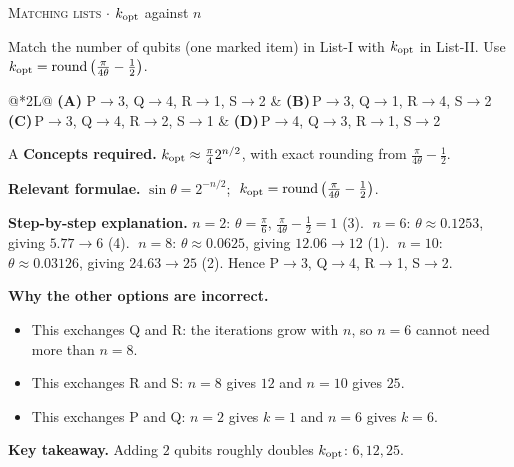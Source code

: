 \documentclass[11pt,a4paper]{article}
\newcommand{\optlabel}[1]{\textbf{(#1)}}
\newcommand{\correctlabel}[1]{\textcolor{okgreen}{\textbf{(#1)}\,\ding{51}}}
\newenvironment{qitem}[1]{\begin{list}{}{\setlength{\leftmargin}{3.3em}\setlength{\labelwidth}{3.1em}%
  \setlength{\labelsep}{0.2em}\setlength{\topsep}{3pt}\setlength{\parsep}{3pt}}\item[\textbf{Q.#1}\hfill]}{\end{list}}
\newcommand{\qsep}{\par\vspace{2pt}{\color{black!15}\hrule}\vspace{4pt}}
\newcommand{\qmeta}[2]{{\footnotesize\color{black!60}\textsc{#1} \;$\cdot$\; #2}\par}
\begin{document}
\begin{qitem}{55}
\qmeta{Matching lists}{$k_{\rm opt}$ against $n$}
Match the number of qubits (one marked item) in List-I with $k_{\rm opt}$ in List-II. Use $k_{\rm opt} = \operatorname{round}\big(\frac{\pi}{4\theta} - \frac12\big)$.
\par\smallskip{}
\par\smallskip\noindent\begin{tabularx}{\linewidth}{@{}*{2}{L}@{}}
\correctlabel{A}\,P$\to$3, Q$\to$4, R$\to$1, S$\to$2 & \optlabel{B}\,P$\to$3, Q$\to$1, R$\to$4, S$\to$2 \\[3pt]
\optlabel{C}\,P$\to$3, Q$\to$4, R$\to$2, S$\to$1 & \optlabel{D}\,P$\to$4, Q$\to$3, R$\to$1, S$\to$2
\end{tabularx}
\end{qitem}
\begin{solbox}{A}
\textbf{\color{brand}Concepts required.} $k_{\rm opt} \approx \frac\pi4 2^{n/2}$, with exact rounding from $\frac{\pi}{4\theta} - \frac12$.

\textbf{\color{brand}Relevant formulae.} $\sin\theta = 2^{-n/2}$; $\;k_{\rm opt} = \operatorname{round}\big(\frac{\pi}{4\theta} - \frac12\big)$.

\textbf{\color{brand}Step-by-step explanation.} $n = 2$: $\theta = \frac\pi6$, $\frac{\pi}{4\theta} - \frac12 = 1$ (3). $\;n = 6$: $\theta \approx 0.1253$, giving $5.77 \to 6$ (4). $\;n = 8$: $\theta \approx 0.0625$, giving $12.06 \to 12$ (1).
$\;n = 10$: $\theta \approx 0.03126$, giving $24.63 \to 25$ (2). Hence P$\to$3, Q$\to$4, R$\to$1, S$\to$2.

\textbf{\color{brand}Why the other options are incorrect.}
\begin{itemize}[leftmargin=2.4em, itemsep=1pt, topsep=2pt]
\item[\textbf{(B)}] This exchanges Q and R: the iterations grow with $n$, so $n = 6$ cannot need more than $n = 8$.
\item[\textbf{(C)}] This exchanges R and S: $n = 8$ gives $12$ and $n = 10$ gives $25$.
\item[\textbf{(D)}] This exchanges P and Q: $n = 2$ gives $k = 1$ and $n = 6$ gives $k = 6$.
\end{itemize}
\textbf{\color{brand}Key takeaway.} Adding $2$ qubits roughly doubles $k_{\rm opt}$: $6, 12, 25$.
\end{solbox}
\qsep
\end{document}
